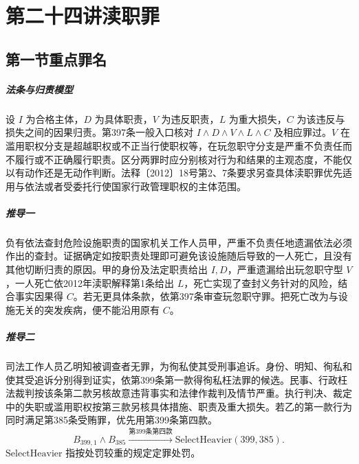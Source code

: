 \chapter{第二十四讲\quad 渎职罪}
\label{lecture:24}
\par

\section{第一节\quad 重点罪名}

\paragraph{法条与归责模型}
设 \(I\) 为合格主体，\(D\) 为具体职责，\(V\) 为违反职责，\(L\) 为重大损失，\(C\) 为该违反与损失之间的因果归责。第397条一般入口核对 \(I\land D\land V\land L\land C\) 及相应罪过。\(V\) 在滥用职权分支是超越职权或不正当行使职权等，在玩忽职守分支是严重不负责任而不履行或不正确履行职责。区分两罪时应分别核对行为和结果的主观态度，不能仅以有动作还是无动作判断。法释〔2012〕18号第2、7条要求另查具体渎职罪优先适用与依法或者受委托行使国家行政管理职权的主体范围。

\paragraph{推导一}
负有依法查封危险设施职责的国家机关工作人员甲，严重不负责任地遗漏依法必须作出的查封。证据确定如按职责处理即可避免该设施随后导致的一人死亡，且没有其他切断归责的原因。甲的身份及法定职责给出 \(I,D\)，严重遗漏给出玩忽职守型 \(V\)，一人死亡依2012年渎职解释第1条给出 \(L\)，死亡实现了查封义务针对的风险，结合事实因果得 \(C\)。若无更具体条款，依第397条审查玩忽职守罪。把死亡改为与设施无关的突发疾病，便不能沿用原有 \(C\)。

\paragraph{推导二}
司法工作人员乙明知被调查者无罪，为徇私使其受刑事追诉。身份、明知、徇私和使其受追诉分别得到证实，依第399条第一款得徇私枉法罪的候选。民事、行政枉法裁判按该条第二款另核故意违背事实和法律作裁判及情节严重。执行判决、裁定中的失职或滥用职权按第三款另核具体措施、职责及重大损失。若乙的第一款行为同时满足第385条受贿罪，优先用第399条第四款。
\[
B_{399,1}\land B_{385}
  \xrightarrow{\text{第399条第四款}}\mathrm{SelectHeavier}(399,385).
\]
\(\mathrm{SelectHeavier}\) 指按处罚较重的规定定罪处罚。

